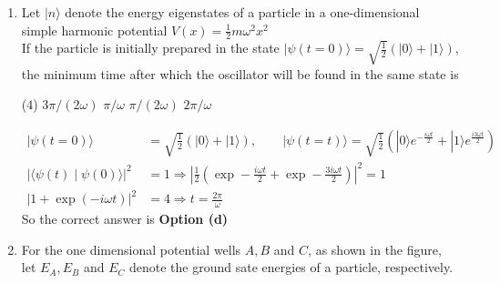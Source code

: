 \begin{enumerate}
\begin{tasks}
	\task[\textbf{a.}]
	\task[\textbf{b.}]
	\task[\textbf{c.}]
	\task[\textbf{d.}] 
\end{tasks}	
The material that would make the most sensitive temperature sensor, when used at temperatures between $T_{1}$ and $T_{2}$, is
 \begin{tasks}(4)
	\task[\textbf{a.}]$\mathrm{A}$
	\task[\textbf{b.}]$\mathrm{B}$
	\task[\textbf{c.}]$\mathrm{C}$
	\task[\textbf{d.}] D
\end{tasks}	
\begin{answer}
 For the temperature sensor, the variation in the resistivity of material should be as large as possible without any local maximum or minimum. Option (a) \& (d) shows minimum while in (b) gradient is very low in comparison to $(\mathrm{C})$. Thus option (c) is the correct answer\\
		So the correct answer is \textbf{Option (c)}
\end{answer}
\item  Let $|n\rangle$ denote the energy eigenstates of a particle in a one-dimensional simple harmonic potential $V(x)=\frac{1}{2} m \omega^{2} x^{2}$\\
If the particle is initially prepared in the state $|\psi(t=0)\rangle=\sqrt{\frac{1}{2}}(|0\rangle+|1\rangle)$, the minimum time after which the oscillator will be found in the same state is
 \begin{tasks}(4)
	\task[\textbf{a.}]$3 \pi /(2 \omega)$
	\task[\textbf{b.}]$\pi / \omega$
	\task[\textbf{c.}]$\pi /(2 \omega)$
	\task[\textbf{d.}] $2 \pi / \omega$
\end{tasks}
\begin{answer}
	\begin{align*}
	|\psi(t=0)\rangle&=\sqrt{\frac{1}{2}}(|0\rangle+|1\rangle), \qquad|\psi(t=t)\rangle=\sqrt{\frac{1}{2}}\left(|0\rangle e^{-\frac{i \omega t}{2}}+|1\rangle e^{\frac{i 3 \omega t}{2}}\right)\\
	|\langle\psi(t) \mid \psi(0)\rangle|^{2}&=1 \Rightarrow\left|\frac{1}{2}\left(\exp -\frac{i \omega t}{2}+\exp -\frac{3 i \omega t}{2}\right)\right|^{2}=1 \\
	|1+\exp (-i \omega t)|^{2}&=4 \Rightarrow t=\frac{2 \pi}{\omega}
	\end{align*}
		So the correct answer is \textbf{Option (d)}
\end{answer}
\item  For the one dimensional potential wells $A, B$ and $C$, as shown in the figure, let $E_{A}, E_{B}$ and $E_{C}$ denote the ground sate energies of a particle, respectively.	

\end{enumerate}
